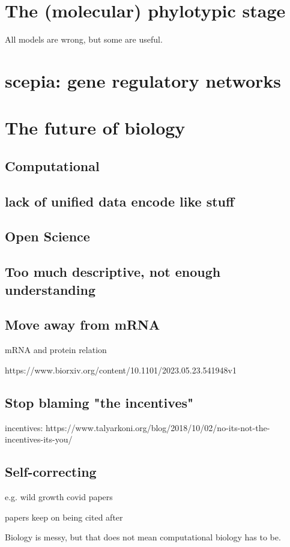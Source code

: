 \section{The (molecular) phylotypic stage}

All models are wrong, but some are useful. 

\section{scepia: gene regulatory networks}

\section{The future of biology}

\subsection{Computational}
\subsection{lack of unified data encode like stuff}

\subsection{Open Science}

\subsection{Too much descriptive, not enough understanding}

\subsection{Move away from mRNA}

mRNA and protein relation

https://www.biorxiv.org/content/10.1101/2023.05.23.541948v1

\subsection{Stop blaming "the incentives"}

incentives: https://www.talyarkoni.org/blog/2018/10/02/no-its-not-the-incentives-its-you/

\subsection{Self-correcting}

e.g. wild growth covid papers

papers keep on being cited after 


Biology is messy, but that does not mean computational biology has to be.

